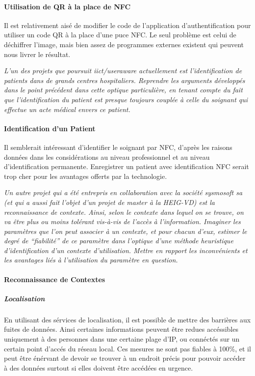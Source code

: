 \documentclass[a4paper,11pt,titlepage]{article}
\begin{document}
\paragraph{Utilisation de QR à la place de NFC}

Il est relativement aisé de modifier le code de l'application d'authentification pour utiliser un code QR à la place d'une puce NFC.
Le seul problème est celui de déchiffrer l'image, mais bien assez de programmes externes existent qui peuvent nous livrer le résultat.

\textit{L'un des projets que poursuit iict/useraware actuellement est l'identification de patients dans de
grands centres hospitaliers. Reprendre les arguments développés dans le point précédent dans cette
optique particulière, en tenant compte du fait que l'identification du patient est presque toujours couplée à
celle du soignant qui effectue un acte médical envers ce patient.}

\paragraph{Identification d'un Patient}
Il semblerait intéressant d'identifier le soignant par NFC, d'après les raisons données dans les considérations au niveau professionnel et au niveau d'identification permanente.
Enregistrer un patient avec identification NFC serait trop cher pour les avantages offerts par la technologie.

\textit{Un autre projet qui a été entrepris en collaboration avec la société sysmosoft sa (et qui a aussi fait
l'objet d'un projet de master à la HEIG-VD) est la reconnaissance  de contexte. Ainsi, selon le contexte dans
lequel on se trouve, on va être plus ou moins tolérant vis-à-vis de l'accès à l'information. Imaginer les
paramètres que l'on peut associer à un contexte, et pour chacun d'eux, estimer le degré de ``fiabilité'' de
ce paramètre dans l'optique d'une méthode heuristique d'identification d'un contexte d'utilisation. Mettre
en rapport les inconvénients et les avantages liés à l'utilisation du paramètre en question.}

\paragraph{Reconnaissance de Contextes}
\subparagraph{Localisation}

En utilisant des sérvices de localisation, il est possible de mettre des barrières aux fuites de données.
Ainsi certaines informations peuvent être redues accéssibles uniquement à des personnes dans une certaine plage d'IP, ou connéctés sur un certain point d'accés du réseau local.
Ces mesures ne sont pas fiables à 100\%, et il peut être énérvant de devoir se trouver à un endroit précis pour pouvoir accéder à des données surtout si elles doivent être accédées en urgence.
\end{document}
